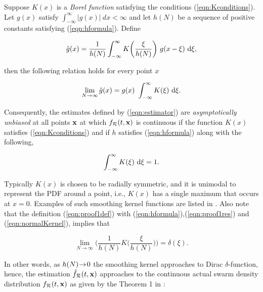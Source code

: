 \documentclass{ifacconf}
\newcommand{\Rconf}{{\mathcal R}}
\newcommand{\bx}{{\bf x}}
\begin{document}
\begin{thm}
	Suppose $K(x)$ is a \emph{Borel function} satisfying the conditions (\ref{eqn:Kconditions}). Let $g(x)$ satisfy $\int_{-\infty}^{\infty} |g(x)| \ dx < \infty$ and let $h(N)$ be a sequence of positive constants satisfying (\ref{eqn:hformula}). Define
	
	\begin{equation} \label{eqn:proof1def}
		\hat{g}(x) = \frac{1}{h(N)} \int_{-\infty}^{\infty} K\bigg(\frac{\xi}{h(N)}\bigg) \ g(x - \xi) \ \textnormal{d}\xi,
	\end{equation}
	
	then the following relation holds for every point $x$
	
	\begin{equation} \label{eqn:proof1res}
		\lim\limits_{N \rightarrow \infty} \hat{g}(x) = g(x) \ \int_{-\infty}^{\infty} K(\xi) \ \textnormal{d} \xi.
	\end{equation}
	
	Consequently, the estimates defined by (\ref{eqn:estimator}) are \emph{asymptotically unbiased} at all points $\bx$ at which $f_\Rconf(t,\bx)$ is continuous if the function $K(x)$ satisfies (\ref{eqn:Kconditions}) and if $h$ satisfies (\ref{eqn:hformula}) along with the following,
	
	\begin{equation} \label{eqn:normalKernel}
		\int_{-\infty}^{\infty} K(\xi) \ \textnormal{d} \xi = 1.
	\end{equation}
\end{thm}

Typically  $K(x)$ is chosen to be  radially symmetric, and it is  unimodal to represent the PDF around a point, i.e., $K(x)$ has a single maximum that occurs at $x = 0$. Examples of such smoothing kernel functions are listed in \cite{parzen1962estimation}. Also note that the definition (\ref{eqn:proof1def})  with (\ref{eqn:hformula}),(\ref{eqn:proof1res}) and (\ref{eqn:normalKernel}), implies that 

\begin{equation*}
	\lim\limits_{N \rightarrow \infty} \Bigg(\frac{1}{h(N)} K\bigg(\frac{\xi}{h(N)}\bigg)\Bigg) = \delta(\xi).
\end{equation*}

In other words, as $h(N) \hspace{-0.7mm} \rightarrow \hspace{-0.7mm} 0$ the smoothing kernel approaches to Dirac $\delta$-function, hence, the estimation $ \hat{f}_\Rconf (t,\bx) $ approaches to the continuous actual swarm density distribution $f_\Rconf(t,\bx)$ as given by the Theorem 1 in \cite{wied2012consistency}:  
\end{document}

